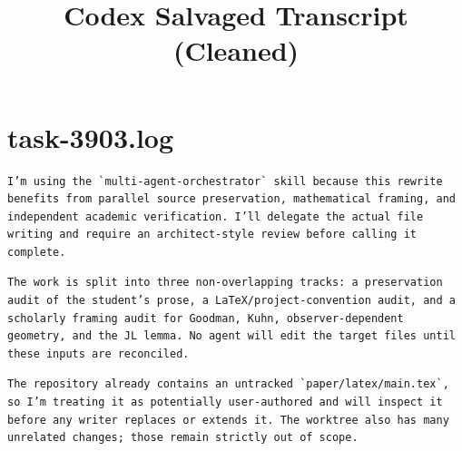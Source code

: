 \documentclass{article}
\begin{document}
\title{Codex Salvaged Transcript (Cleaned)}
\date{}
\maketitle
\section*{task-3903.log}
\begin{Verbatim}[breaklines=true]
I’m using the `multi-agent-orchestrator` skill because this rewrite benefits from parallel source preservation, mathematical framing, and independent academic verification. I’ll delegate the actual file writing and require an architect-style review before calling it complete.
\end{Verbatim}
\begin{Verbatim}[breaklines=true]
The work is split into three non-overlapping tracks: a preservation audit of the student’s prose, a LaTeX/project-convention audit, and a scholarly framing audit for Goodman, Kuhn, observer-dependent geometry, and the JL lemma. No agent will edit the target files until these inputs are reconciled.
\end{Verbatim}
\begin{Verbatim}[breaklines=true]
The repository already contains an untracked `paper/latex/main.tex`, so I’m treating it as potentially user-authored and will inspect it before any writer replaces or extends it. The worktree also has many unrelated changes; those remain strictly out of scope.
\end{Verbatim}
\end{document}
